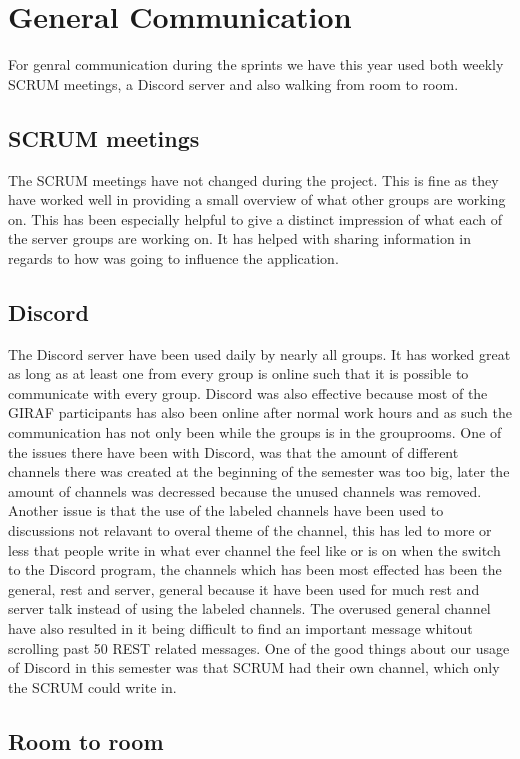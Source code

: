 \section{General Communication}
For genral communication during the sprints we have this year used both weekly
SCRUM meetings, a Discord server and also walking from room to room.

\subsection{SCRUM meetings}
The SCRUM meetings have not changed during the project. This is fine as they
have worked well in providing a small overview of what other groups are working
on. This has been especially helpful to give a distinct impression of what each
of the server groups are working on. It has helped with sharing information in
regards to how  was going to influence the application.

\subsection{Discord}
The Discord server have been used daily by nearly all groups. It has worked
great as long as at least one from every group is online such that it is
possible to communicate with every group. Discord was also effective because
most of the GIRAF participants has also been online after normal work hours and
as such the communication has not only been while the groups is in the grouprooms.
One of the issues there have been with Discord, was that the amount of different
channels there was created at the beginning of the semester was too big, later
the amount of channels was decressed because the unused channels was removed.
Another issue is that the use of the labeled channels have been used to
discussions not relavant to overal theme of the channel, this has led to more or
less that people write in what ever channel the feel like or is on when the
switch to the Discord program, the channels which has been most effected has
been the general, rest and server, general because it have been used for much
rest and server talk instead of using the labeled channels. The overused general
channel have also resulted in it being difficult to find an important message
whitout scrolling past 50 REST related messages. One of the good things about
our usage of Discord in this semester was that SCRUM had their own channel,
which only the SCRUM could write in.

\subsection{Room to room}

